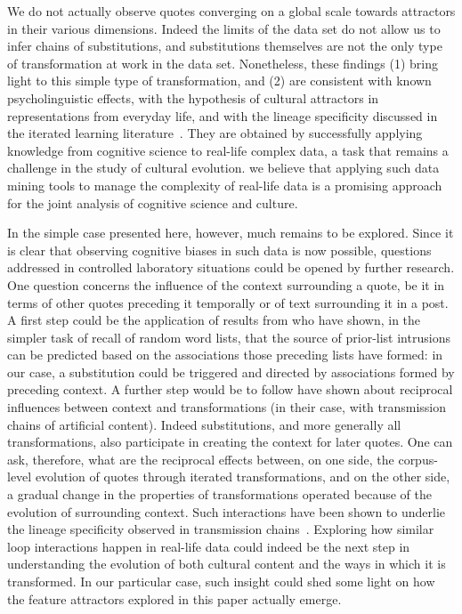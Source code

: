\begin{new}
We do not actually observe quotes converging on a global scale towards attractors in their various dimensions.
Indeed the limits of the data set do not allow us to infer chains of substitutions, and substitutions themselves are not the only type of transformation at work in the data set.
Nonetheless, these findings (1) bring light to this simple type of transformation, and (2) are consistent with known psycholinguistic effects, with the hypothesis of cultural attractors in representations from everyday life, and with the lineage specificity discussed in the iterated learning literature~\citep{claidiere_cultural_2014,cornish_systems_2013}.
They are obtained by successfully applying knowledge from cognitive science to real-life complex data, a task that remains a challenge in the study of cultural evolution.
 we believe that applying such data mining tools to manage the complexity of real-life data is a promising approach for the joint analysis of cognitive science and culture.

In the simple case presented here, however, much remains to be explored.
Since it is clear that observing cognitive biases in such data is now possible, questions addressed in controlled laboratory situations could be opened by further research.
One question concerns the influence of the context surrounding a quote, be it in terms of other quotes preceding it temporally or of text surrounding it in a post.
A first step could be the application of results from \citet{zaromb_temporal_2006} who have shown, in the simpler task of recall of random word lists, that the source of prior-list intrusions can be predicted based on the associations those preceding lists have formed:
in our case, a substitution could be triggered and directed by associations formed by preceding context.
A further step would be to follow \citet{cornish_systems_2013} have shown about reciprocal influences between context and transformations (in their case, with transmission chains of artificial content).
Indeed substitutions, and more generally all transformations, also participate in creating the context for later quotes.
One can ask, therefore, what are the reciprocal effects between, on one side, the corpus-level evolution of quotes through iterated transformations, and on the other side, a gradual change in the properties of transformations operated because of the evolution of surrounding context.
Such interactions have been shown to underlie the lineage specificity observed in transmission chains~\citep{claidiere_cultural_2014}.
Exploring how similar loop interactions happen in real-life data could indeed be the next step in understanding the evolution of both cultural content and the ways in which it is transformed.
In our particular case, such insight could shed some light on how the feature attractors explored in this paper actually emerge.

\end{new}

